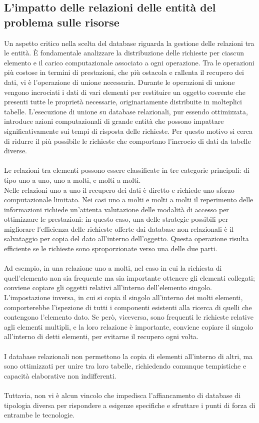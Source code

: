 \subsection{L'impatto delle relazioni delle entità del problema sulle risorse}
Un aspetto critico nella scelta del database riguarda la gestione delle relazioni tra le entità. 
È fondamentale analizzare la distribuzione delle richieste per ciascun elemento e il carico computazionale associato a ogni operazione. 
Tra le operazioni più costose in termini di prestazioni, che più ostacola e rallenta il recupero dei dati, vi è l’operazione di unione necessaria. 
Durante le operazioni di unione vengono incrociati i dati di vari elementi per restituire un oggetto coerente che presenti tutte le proprietà necessarie, 
originariamente distribuite in molteplici tabelle. 
L’esecuzione di unione su database relazionali, pur essendo ottimizzata, 
introduce azioni computazionali di grande entità che possono impattare significativamente sui tempi di risposta delle richieste. 
Per questo motivo si cerca di ridurre il più possibile le richieste che comportano l’incrocio di dati da tabelle diverse. \\
\\
Le relazioni tra elementi possono essere classificate in tre categorie principali: 
di tipo uno a uno, uno a molti, e molti a molti. \\
Nelle relazioni uno a uno il recupero dei dati è diretto e richiede uno sforzo computazionale limitato. 
Nei casi uno a molti e molti a molti il reperimento delle informazioni richiede un’attenta valutazione delle modalità di accesso per ottimizzare le prestazioni: 
in questo caso, una delle strategie possibili per migliorare l’efficienza delle richieste offerte dai database non relazionali è il salvataggio per copia del dato all’interno dell’oggetto. 
Questa operazione risulta efficiente se le richieste sono sproporzionate verso una delle due parti.\\
\\
Ad esempio, in una relazione uno a molti, nel caso in cui la richiesta di quell’elemento non sia frequente ma sia importante ottenere gli elementi collegati; 
conviene copiare gli oggetti relativi all’interno dell’elemento singolo. 
L’impostazione inversa, in cui si copia il singolo all’interno dei molti elementi, 
comporterebbe l’ispezione di tutti i componenti esistenti alla ricerca di quelli che contengono l’elemento dato. 
Se però, viceversa, sono frequenti le richieste relative agli elementi multipli, e la loro relazione è importante, 
conviene copiare il singolo all'interno di detti elementi, per evitarne il recupero ogni volta.\\
\\
I database relazionali non permettono la copia di elementi all’interno di altri, ma sono ottimizzati per unire tra loro tabelle, 
richiedendo comunque tempistiche e capacità elaborative non indifferenti. \\
\\
Tuttavia, non vi è alcun vincolo che impedisca l’affiancamento di database di tipologia diversa per rispondere a esigenze specifiche e sfruttare i punti di forza di entrambe le tecnologie.

